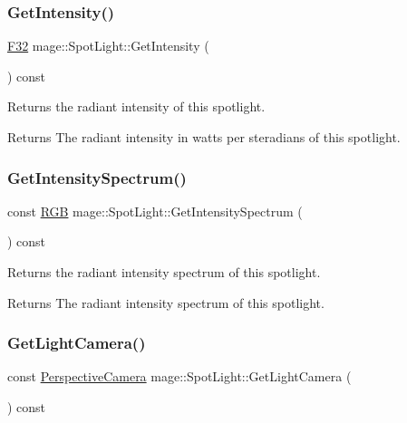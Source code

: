 \subsubsection{\texorpdfstring{Get\+Intensity()}{GetIntensity()}}
{\footnotesize\ttfamily \hyperlink{namespacemage_aa97e833b45f06d60a0a9c4fc22ae02c0}{F32} mage\+::\+Spot\+Light\+::\+Get\+Intensity (\begin{DoxyParamCaption}{ }\end{DoxyParamCaption}) const\hspace{0.3cm}{\ttfamily [noexcept]}}

Returns the radiant intensity of this spotlight.

\begin{DoxyReturn}{Returns}
The radiant intensity in watts per steradians of this spotlight. 
\end{DoxyReturn}
\hypertarget{classmage_1_1_spot_light_ad05d3abab9285f8c25ac42ee446d6e05}{}\label{classmage_1_1_spot_light_ad05d3abab9285f8c25ac42ee446d6e05} 
\subsubsection{\texorpdfstring{Get\+Intensity\+Spectrum()}{GetIntensitySpectrum()}}
{\footnotesize\ttfamily const \hyperlink{structmage_1_1_r_g_b}{R\+GB} mage\+::\+Spot\+Light\+::\+Get\+Intensity\+Spectrum (\begin{DoxyParamCaption}{ }\end{DoxyParamCaption}) const\hspace{0.3cm}{\ttfamily [noexcept]}}

Returns the radiant intensity spectrum of this spotlight.

\begin{DoxyReturn}{Returns}
The radiant intensity spectrum of this spotlight. 
\end{DoxyReturn}
\hypertarget{classmage_1_1_spot_light_ad702870b00f285bbedd76caa5eac26f5}{}\label{classmage_1_1_spot_light_ad702870b00f285bbedd76caa5eac26f5} 
\subsubsection{\texorpdfstring{Get\+Light\+Camera()}{GetLightCamera()}}
{\footnotesize\ttfamily const \hyperlink{classmage_1_1_perspective_camera}{Perspective\+Camera} mage\+::\+Spot\+Light\+::\+Get\+Light\+Camera (\begin{DoxyParamCaption}{ }\end{DoxyParamCaption}) const\hspace{0.3cm}{\ttfamily [noexcept]}}

